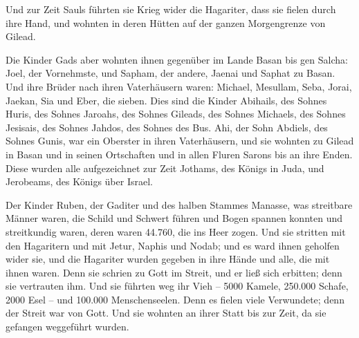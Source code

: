  Und zur Zeit Sauls führten sie Krieg wider die Hagariter,
dass sie fielen durch ihre Hand, und wohnten in deren Hütten auf der
ganzen Morgengrenze von Gilead.

 Die Kinder Gads aber wohnten ihnen gegenüber im Lande
Basan bis gen Salcha:  Joel, der Vornehmste, und Sapham,
der andere, Jaenai und Saphat zu Basan.  Und ihre Brüder
nach ihren Vaterhäusern waren: Michael, Mesullam, Seba, Jorai, Jaekan,
Sia und Eber, die sieben.  Dies sind die Kinder Abihails,
des Sohnes Huris, des Sohnes Jaroahs, des Sohnes Gileads, des Sohnes
Michaels, des Sohnes Jesisais, des Sohnes Jahdos, des Sohnes des Bus.
 Ahi, der Sohn Abdiels, des Sohnes Gunis, war ein Oberster
in ihren Vaterhäusern,  und sie wohnten zu Gilead in Basan
und in seinen Ortschaften und in allen Fluren Sarons bis an ihre Enden.
 Diese wurden alle aufgezeichnet zur Zeit Jothams, des
Königs in Juda, und Jerobeams, des Königs über Israel.

 Der Kinder Ruben, der Gaditer und des halben Stammes
Manasse, was streitbare Männer waren, die Schild und Schwert führen und
Bogen spannen konnten und streitkundig waren, deren waren 44.760, die
ins Heer zogen.  Und sie stritten mit den Hagaritern und
mit Jetur, Naphis und Nodab;  und es ward ihnen geholfen
wider sie, und die Hagariter wurden gegeben in ihre Hände und alle, die
mit ihnen waren. Denn sie schrien zu Gott im Streit, und er ließ sich
erbitten; denn sie vertrauten ihm.  Und sie führten weg ihr
Vieh -- 5000 Kamele, 250.000 Schafe, 2000 Esel -- und 100.000
Menschenseelen.  Denn es fielen viele Verwundete; denn der
Streit war von Gott. Und sie wohnten an ihrer Statt bis zur Zeit, da sie
gefangen weggeführt wurden.

